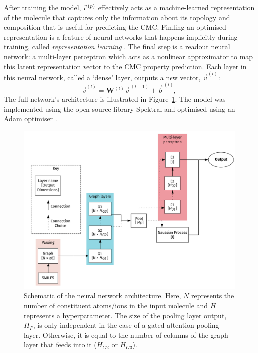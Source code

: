 After training the model, $\vec{v}^{\,(p)}{}$ effectively acts as a machine-learned representation of the molecule that captures only the information about its topology and composition that is useful for predicting the CMC. Finding an optimised representation is a feature of neural networks that happens implicitly during training, called \emph{representation learning} \cite{goodfellowRepresentationLearning2016}.
The final step is a readout neural network: a multi-layer perceptron which acts as a nonlinear approximator to map this
latent representation vector to the CMC property prediction. Each layer in this neural network, called a `dense' layer, outputs a new vector, $\vec{v}^{(l)}$:
\begin{equation}
    \vec{v}^{(l)} = \mathbf{W}^{(l)}\vec{v}^{\,(l-1)} + \vec{b}^{\,(l)},
\end{equation}
The full network's architecture is illustrated in Figure~\ref{fig:model-topology}. The model was implemented using the open-source library Spektral\cite{grattarolaGraphNeuralNetworks2020} and optimised using an Adam optimiser \cite{kingmaAdamMethodStochastic2017a}.

\begin{figure}
    \centering
    \includegraphics[width=\textwidth]{images/model_graph.pdf}
    \caption{Schematic of the neural network architecture. Here, $N$ represents
        the number of constituent atoms/ions in the input molecule and $H$
        represents a hyperparameter. The size of the pooling layer output, $H_P$, is
        only independent in the case of a gated attention-pooling layer. Otherwise,
        it is equal to the number of columns of the graph layer that feeds into it
        ($H_{G2}$ or $H_{G3}$).}
    \label{fig:model-topology}
\end{figure}

